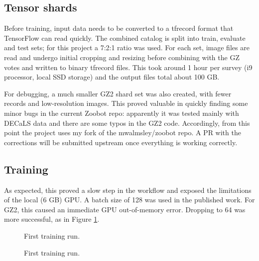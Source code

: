 \documentclass[twocolumn, twocolappendix, tighten]{aastex631}
\begin{document}
\subsection{Tensor shards}

Before training, input data needs to be converted to a tfrecord format that TensorFlow can read quickly. The combined catalog is split into train, evaluate and test sets; for this project a 7:2:1 ratio was used. For each set, image files are read and undergo initial cropping and resizing before combining with the GZ votes and written to binary tfrecord files. This took around 1 hour per survey (i9 processor, local SSD storage) and the output files total about 100 GB.

For debugging, a much smaller GZ2 shard set was also created, with fewer records and low-resolution images. This proved valuable in quickly finding some minor bugs in the current Zoobot repo: apparently it was tested mainly with DECaLS data and there are some typos in the GZ2 code. Accordingly, from this point the project uses my fork of the mwalmsley/zoobot repo. A PR with the corrections will be submitted upstream once everything is working correctly.

\subsection{Training}

As expected, this proved a slow step in the workflow and exposed the limitations of the local (6 GB) GPU. A batch size of 128 was used in the published work. For GZ2, this caused an immediate GPU out-of-memory error. Dropping to 64 was more successful, as in Figure \ref{fig:gz2_train_64}. 

\begin{figure}[htb!]
	\caption{
		\label{fig:gz2_train_64}}
\end{figure}



\begin{figure}[htb!]
	\caption{First training run.
		\label{fig:decals_train}}
\end{figure}



\begin{figure}[htb!]
	\caption{First training run.
		\label{fig:gz2_train_32}}
\end{figure}


{}

\end{document}
